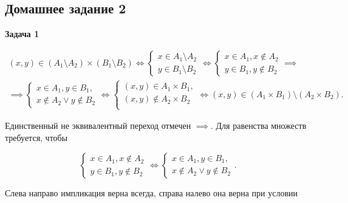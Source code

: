 \subsection{Домашнее задание 2}

\begin{center}
    \textbf{Задача 1}
\end{center}
\begin{multline*}
    (x, y) \in (A_1 \setminus A_2) \times (B_1 \setminus B_2)
    \Longleftrightarrow
    \begin{cases}
        x \in A_1 \setminus A_2 \\
        y \in B_1 \setminus B_2
    \end{cases}
    \Longleftrightarrow
    \begin{cases}
        x \in A_1, x \not\in A_2 \\
        y \in B_1, y \not\in B_2
    \end{cases}
    \implies \\ \implies
    \begin{cases}
        x \in A_1, y \in B_1, \\
        x \not\in A_2 \lor y \not\in B_2
    \end{cases}
    \Longleftrightarrow
    \begin{cases}
        (x, y) \in A_1 \times B_1, \\
        (x, y) \not\in A_2 \times B_2 \\
    \end{cases}
    \Longleftrightarrow
    (x, y) \in (A_1 \times B_1) \setminus (A_2 \times B_2).
\end{multline*}

Единственный не эквивалентный переход отмечен $\implies$. Для равенства множеств требуется, чтобы

\begin{equation*}
    \begin{cases}
        x \in A_1, x \not\in A_2 \\
        y \in B_1, y \not\in B_2
    \end{cases}
    \Longleftrightarrow
    \begin{cases}
        x \in A_1, y \in B_1, \\
        x \not\in A_2 \lor y \not\in B_2
    \end{cases}.
\end{equation*}

Слева направо импликация верна всегда, справа налево она верна при условии

